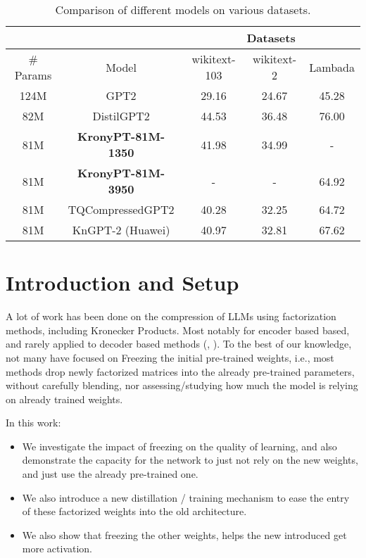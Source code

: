 \documentclass{article}
\begin{document}
\begin{table}[h]
\centering
\begin{tabular}{|c|c|c|c|c|}
\hline
 & & \multicolumn{3}{c|}{Datasets} \\ \hline
\# Params &  Model            & wikitext-103 & wikitext-2 & Lambada \\ \hline
124M      & GPT2              & 29.16        & 24.67      & 45.28      \\ \hline
82M       & DistilGPT2        & 44.53        & 36.48      & 76.00      \\ \hline
81M       & \textbf{KronyPT-81M-1350}  & 41.98        & 34.99      & -          \\ \hline
81M       & \textbf{KronyPT-81M-3950}  & -            & -          & 64.92      \\ \hline
81M       & TQCompressedGPT2  & 40.28        & 32.25      & 64.72      \\ \hline
81M       & KnGPT-2 (Huawei)  & 40.97        & 32.81      & 67.62      \\ \hline
\end{tabular}
\caption{Comparison of different models on various datasets.}
\end{table}



\section{Introduction and Setup}
\label{sec:Introduction and Setup}


A lot of work has been done on the compression of LLMs using factorization methods, including Kronecker Products. Most notably for encoder based based, and rarely applied to decoder based methods (\cite{tahaei2022kroneckerbert}, \cite{edalati2021kroneckr}). To the best of our knowledge, not many have focused on Freezing the initial pre-trained weights, i.e., most methods drop newly factorized matrices into the already pre-trained parameters, without carefully blending, nor assessing/studying how much the model is relying on already trained weights.

In this work:

\begin{itemize}
	\item   We investigate the impact of freezing on the quality of learning,  and also demonstrate the capacity for the network to just not rely on the new weights, and just use the already pre-trained one. 
	\item We also introduce a new distillation / training mechanism to ease the entry of these factorized weights into the old architecture. 
	\item We also show that freezing the other weights, helps the new introduced get more activation.
\end{itemize}
\end{document}
